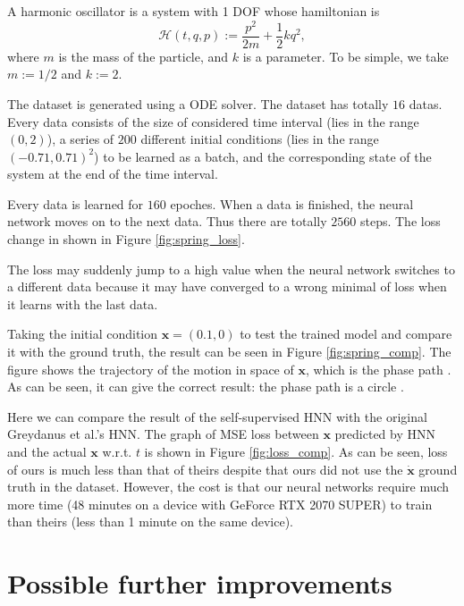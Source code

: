 \documentclass{article}
\begin{document}
A harmonic oscillator is a system with 1 DOF whose hamiltonian is \cite[p. 157]{landau1976mechanics}
\begin{equation*}
	\mathcal H\left(t,q,p\right):=\frac{p^2}{2m}+\frac12kq^2,
\end{equation*}
where $m$ is the mass of the particle, and $k$ is a parameter.
To be simple, we take $m:=1/2$ and $k:=2$.

The dataset is generated using a ODE solver.
The dataset has totally $16$ datas.
Every data consists of the size of considered time interval
(lies in the range $\left(0,2\right)$),
a series of $200$ different initial conditions
(lies in the range $\left(-0.71,0.71\right)^2$)
to be learned as a batch,
and the corresponding state of the system at the end of the time interval.

Every data is learned for $160$ epoches.
When a data is finished, the neural network moves on to the next data.
Thus there are totally $2560$ steps.
The loss change in shown in Figure \ref{fig:spring_loss}.

The loss may suddenly jump to a high value when the neural network switches to a different data
because it may have converged to a wrong minimal of loss when it learns with the last data.

Taking the initial condition $\mathbf x=\left(0.1,0\right)$
to test the trained model and compare it with the ground truth,
the result can be seen in Figure \ref{fig:spring_comp}.
The figure shows the trajectory of the motion in space of $\mathbf x$,
which is the phase path \cite[p. 146]{landau1976mechanics}\cite[p. 68]{arnold1989mathmech}.
As can be seen, it can give the correct result:
the phase path is a circle \cite[p. 17]{arnold1989mathmech}.

Here we can compare the result of the self-supervised HNN with the original Greydanus et al.'s HNN.
The graph of MSE loss between $\mathbf x$ predicted by HNN and the actual $\mathbf x$ w.r.t. $t$ is shown in Figure \ref{fig:loss_comp}.
As can be seen, loss of ours is much less than that of theirs
despite that ours did not use the $\dot{\mathbf x}$ ground truth in the dataset.
However, the cost is that our neural networks require much more time
(48 minutes on a device with GeForce RTX 2070 SUPER) to train
than theirs (less than 1 minute on the same device).

\section{Possible further improvements}
\end{document}
